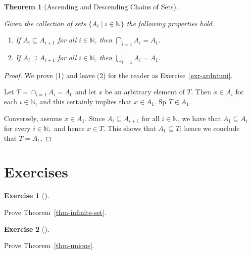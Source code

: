 \documentclass[
  letterpaper,
  10pt,
  reqno,
  twopage,
  openany]{book}
\providecommand{\tightlist}{%
  \setlength{\itemsep}{0pt}\setlength{\parskip}{0pt}}\usepackage{longtable,booktabs,array}
\theoremstyle{plain}
\theoremstyle{definition}
\newtheorem{exercise}{Exercise}[chapter]
\theoremstyle{definition}
\theoremstyle{definition}
\theoremstyle{plain}
\theoremstyle{plain}
\newtheorem{theorem}{Theorem}[chapter]
\theoremstyle{remark}
\begin{document}
\leavevmode{}%
\begin{theorem}[Ascending and Descending Chains of
Sets]\label{thm-ardntuni}

Given the collection of sets \(\{A_i \mid i\in \mathbb{N}\}\) the
following properties hold.

\begin{enumerate}
\def\labelenumi{\arabic{enumi}.}
\tightlist
\item
  If \(A_i \subseteq A_{i+1}\) for all \(i\in \mathbb{N}\), then
  \(\bigcap_{i=1}A_i=A_1\).
\item
  If \(A_i \supseteq A_{i+1}\) for all \(i\in \mathbb{N}\), then
  \(\bigcup_{i=1}A_i=A_1\).
\end{enumerate}

\end{theorem}

\begin{proof}

We prove (1) and leave (2) for the reader as
Exercise~\ref{exr-ardntuni}.

Let \(T=\cap_{i=1}A_i=A_0\) and let \(x\) be an arbitrary element of
\(T\). Then \(x\in A_i\) for each \(i\in \mathbb{N}\), and this
certainly implies that \(x\in A_1\). Sp \(T\in A_1\).

Conversely, assume \(x\in A_1\). Since \(A_i \subseteq A_{i+1}\) for all
\(i\in\mathbb{N}\), we have that \(A_1\subseteq A_i\) for every
\(i\in \mathbb{N},\) and hence \(x\in T.\) This shows that
\(A_1\subseteq T\); hence we conclude that \(T=A_1\).

\end{proof}

\hypertarget{exercises-3}{%
\section{Exercises}\label{exercises-3}}

\leavevmode{}%
\begin{exercise}[]\label{exr-infinite-set}

Prove Theorem~\ref{thm-infinite-set}.

\end{exercise}

\leavevmode{}%
\begin{exercise}[]\label{exr-unions}

Prove Theorem~\ref{thm-unions}.

\end{exercise}
\end{document}
